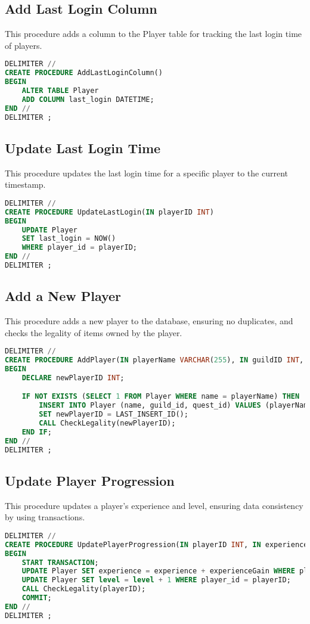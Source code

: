 \documentclass{article}
\begin{document}
\subsection{Add Last Login Column}
This procedure adds a column to the Player table for tracking the last login time of players.
\begin{lstlisting}[language=sql,caption=Add Last Login Column]
DELIMITER //
CREATE PROCEDURE AddLastLoginColumn()
BEGIN
    ALTER TABLE Player
    ADD COLUMN last_login DATETIME;
END //
DELIMITER ;
\end{lstlisting}

\subsection{Update Last Login Time}
This procedure updates the last login time for a specific player to the current timestamp.
\begin{lstlisting}[language=sql,caption=Update Last Login Time]
DELIMITER //
CREATE PROCEDURE UpdateLastLogin(IN playerID INT)
BEGIN
    UPDATE Player
    SET last_login = NOW()
    WHERE player_id = playerID;
END //
DELIMITER ;
\end{lstlisting}

\subsection{Add a New Player}
This procedure adds a new player to the database, ensuring no duplicates, and checks the legality of items owned by the player.
\begin{lstlisting}[language=sql,caption=Add a New Player]
DELIMITER //
CREATE PROCEDURE AddPlayer(IN playerName VARCHAR(255), IN guildID INT, IN questID INT)
BEGIN
    DECLARE newPlayerID INT;

    IF NOT EXISTS (SELECT 1 FROM Player WHERE name = playerName) THEN
        INSERT INTO Player (name, guild_id, quest_id) VALUES (playerName, guildID, questID);
        SET newPlayerID = LAST_INSERT_ID();
        CALL CheckLegality(newPlayerID);
    END IF;
END //
DELIMITER ;
\end{lstlisting}

\subsection{Update Player Progression}
This procedure updates a player's experience and level, ensuring data consistency by using transactions.
\begin{lstlisting}[language=sql,caption=Update Player Progression]
DELIMITER //
CREATE PROCEDURE UpdatePlayerProgression(IN playerID INT, IN experienceGain INT)
BEGIN
    START TRANSACTION;
    UPDATE Player SET experience = experience + experienceGain WHERE player_id = playerID;
    UPDATE Player SET level = level + 1 WHERE player_id = playerID;
    CALL CheckLegality(playerID);
    COMMIT;
END //
DELIMITER ;
\end{lstlisting}
\end{document}
